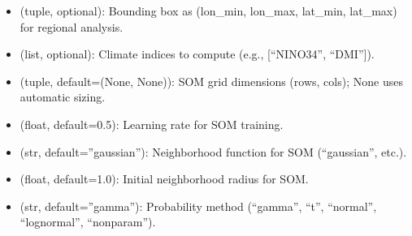 \documentclass[letterpaper,10pt,english]{sphinxmanual}
\begin{document}
\begin{itemize}
\item {} 
\sphinxAtStartPar
{} (tuple, optional): Bounding box as (lon\_min, lon\_max, lat\_min, lat\_max) for regional analysis.

\item {} 
\sphinxAtStartPar
{} (list, optional): Climate indices to compute (e.g., {[}“NINO34”, “DMI”{]}).

\item {} 
\sphinxAtStartPar
{} (tuple, default=(None, None)): SOM grid dimensions (rows, cols); None uses automatic sizing.

\item {} 
\sphinxAtStartPar
{} (float, default=0.5): Learning rate for SOM training.

\item {} 
\sphinxAtStartPar
{} (str, default=”gaussian”): Neighborhood function for SOM (“gaussian”, etc.).

\item {} 
\sphinxAtStartPar
{} (float, default=1.0): Initial neighborhood radius for SOM.

\item {} 
\sphinxAtStartPar
{} (str, default=”gamma”): Probability method (“gamma”, “t”, “normal”, “lognormal”, “nonparam”).

\end{itemize}
\end{document}
